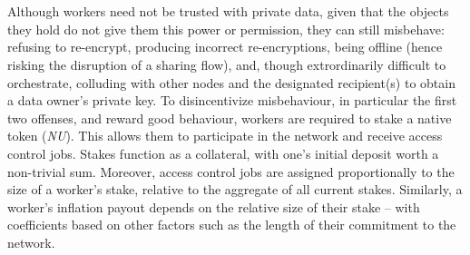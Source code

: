 \documentclass[11pt]{amsart}
\begin{document}
\\
\\
Although workers need not be trusted with private data, given that the objects they hold do not give them this power or permission, they can still misbehave: refusing to re-encrypt, producing incorrect re-encryptions, being offline (hence risking the disruption of a sharing flow), and, though extrordinarily difficult to orchestrate, colluding with other nodes and the designated recipient(s) to obtain a data owner’s private key. To disincentivize misbehaviour, in particular the first two offenses, and reward good behaviour, workers are required to stake a native token ({\it NU}). This allows them to participate in the network and receive access control jobs. Stakes function as a collateral, with one's initial deposit worth a non-trivial sum. Moreover, access control jobs are assigned proportionally to the size of a worker's stake, relative to the aggregate of all current stakes. Similarly, a worker's inflation payout depends on the relative size of their stake – with coefficients based on other factors such as the length of their commitment to the network. 



\appendix


\end{document}
